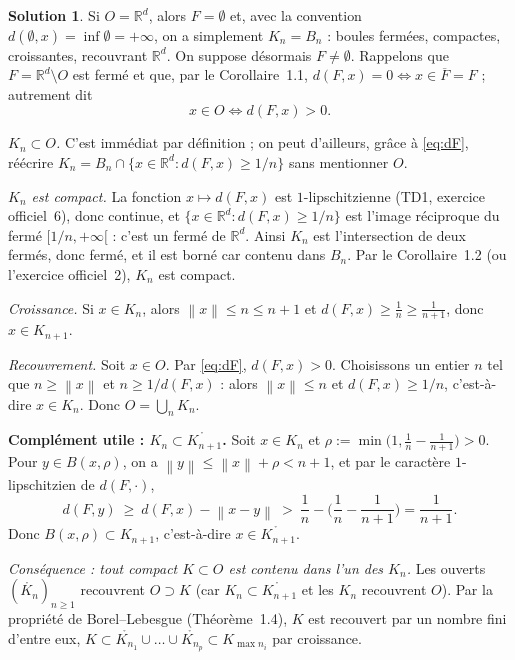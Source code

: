 \documentclass[11pt,a4paper]{article}
\newcommand{\R}{\mathbb{R}}
\newcommand{\interieur}[1]{\mathring{#1}}
\newcommand{\adh}[1]{\overline{#1}}
\newcommand{\norm}[1]{\left\|#1\right\|}
\newcommand{\ie}{c'est-à-dire}
\theoremstyle{definition}
\newtheorem*{solution}{Solution}
\begin{document}
\begin{solution}
Si $O=\R^d$, alors $F=\emptyset$ et, avec la convention $d(\emptyset,x)=\inf\emptyset=+\infty$, on a simplement $K_n=B_n$ : boules fermées, compactes, croissantes, recouvrant $\R^d$. On suppose désormais $F\ne\emptyset$. Rappelons que $F=\R^d\setminus O$ est fermé et que, par le Corollaire~1.1, $d(F,x)=0\iff x\in\adh F=F$ ; autrement dit
\begin{equation}\label{eq:dF}
x\in O\iff d(F,x)>0 .
\end{equation}

\emph{$K_n\subset O$.} C'est immédiat par définition ; on peut d'ailleurs, grâce à \eqref{eq:dF}, réécrire $K_n=B_n\cap\{x\in\R^d : d(F,x)\ge1/n\}$ sans mentionner $O$.

\emph{$K_n$ est compact.} La fonction $x\mapsto d(F,x)$ est $1$-lipschitzienne (TD1, exercice officiel~6), donc continue, et $\{x\in\R^d : d(F,x)\ge1/n\}$ est l'image réciproque du fermé $[1/n,+\infty[$ : c'est un fermé de $\R^d$. Ainsi $K_n$ est l'intersection de deux fermés, donc fermé, et il est borné car contenu dans $B_n$. Par le Corollaire~1.2 (ou l'exercice officiel~2), $K_n$ est compact.

\emph{Croissance.} Si $x\in K_n$, alors $\norm x\le n\le n+1$ et $d(F,x)\ge\frac1n\ge\frac1{n+1}$, donc $x\in K_{n+1}$.

\emph{Recouvrement.} Soit $x\in O$. Par \eqref{eq:dF}, $d(F,x)>0$. Choisissons un entier $n$ tel que $n\ge\norm x$ et $n\ge1/d(F,x)$ : alors $\norm x\le n$ et $d(F,x)\ge1/n$, \ie{} $x\in K_n$. Donc $O=\bigcup_nK_n$.

\medskip
\noindent\textbf{Complément utile : $K_n\subset\interieur{K_{n+1}}$.} Soit $x\in K_n$ et $\rho:=\min\big(1,\frac1n-\frac1{n+1}\big)>0$. Pour $y\in B(x,\rho)$, on a $\norm y\le\norm x+\rho<n+1$, et par le caractère $1$-lipschitzien de $d(F,\cdot)$,
\[
d(F,y)\ \ge\ d(F,x)-\norm{x-y}\ >\ \frac1n-\Big(\frac1n-\frac1{n+1}\Big)=\frac1{n+1}.
\]
Donc $B(x,\rho)\subset K_{n+1}$, \ie{} $x\in\interieur{K_{n+1}}$.

\emph{Conséquence : tout compact $K\subset O$ est contenu dans l'un des $K_n$.} Les ouverts $(\interieur{K_{n}})_{n\ge1}$ recouvrent $O\supset K$ (car $K_n\subset\interieur{K_{n+1}}$ et les $K_n$ recouvrent $O$). Par la propriété de Borel--Lebesgue (Théorème~1.4), $K$ est recouvert par un nombre fini d'entre eux, $K\subset\interieur{K_{n_1}}\cup\dots\cup\interieur{K_{n_p}}\subset K_{\max n_i}$ par croissance.
\end{solution}
\end{document}
